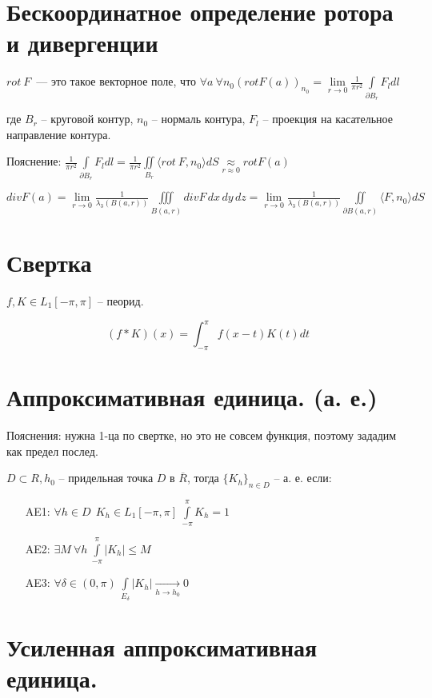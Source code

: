 \documentclass[paper=a4, fontsize=17pt]{article}
\begin{document}
	\section{Бескоординатное определение ротора и дивергенции}
	$rot\ F$~--- это такое векторное поле, что $\forall a \ \forall n_0 (rot F(a))_{n_0} = \lim\limits_{r\to 0} \frac{1}{\pi r^2} \int\limits_{\partial B_r} F_ldl$
		
	где $ B_r $ -- круговой контур, $ n_0 $ -- нормаль контура, $ F_l $ -- проекция на касательное направление контура. 

	Пояснение: $ \frac{1}{\pi r^2} \int\limits_{\partial B_r} F_ldl =  \frac{1}{\pi r^2} \iint\limits_{B_r} \langle rot\ F, n_0 \rangle dS \underset{r \approx 0}{\approx} rot F(a)$
	


	$div F(a) = \lim\limits_{r\to 0} \frac{1}{\lambda_3(B(a,r))} \iiint\limits_{B(a,r)} div F \,dx\,dy\,dz = \lim\limits_{r\to 0} \frac{1}{\lambda_3(B(a,r))} \iint\limits_{\partial B(a,r)} \langle F, n_0 \rangle dS$

	\section{Свертка}
	$ f, K \in L_1[-\pi, \pi]$  -- пеорид.

	$$ (f \ast K)(x) = \int_{-\pi}^{\pi} f(x-t)K(t) dt$$

\section{Аппроксимативная единица. (а. е.)}
	
	Пояснения: нужна 1-ца по свертке, но это не совсем функция, поэтому зададим как предел послед.
	
	$ D \subset R, h_0 $ -- придельная точка $ D $ в $ \overline{R} $, 
	тогда $ \{K_h\}_{n \in D}$ -- а. е. если:
	\begin{itemize}
		\item[AE1: ] $ \forall h \in D ~~ K_h \in L_1[-\pi, \pi] ~ \int\limits_{-\pi}^{\pi} K_h = 1 $
		\item[AE2: ] $ \exists M ~ \forall h ~ \int\limits_{-\pi}^{\pi} |K_h| \leq M $
		\item[AE3: ] $ \forall \delta \in (0, \pi) ~  \int\limits_{E_\delta} | K_h | 
		\underset{h \rightarrow h_0}{\rightarrow} 0  $
	\end{itemize}
	
\section{Усиленная аппроксимативная единица.}
	
\end{document}
